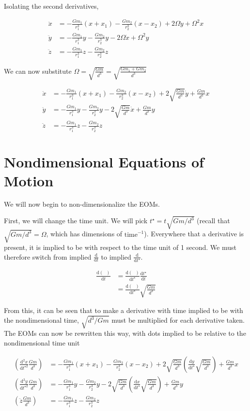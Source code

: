 \documentclass{article}
\newcommand{\dd}[2]{\frac{\mathrm{d}#1}{\mathrm{d}#2}}
\begin{document}
Isolating the second derivatives,

\[\begin{aligned}
    \ddot{x}&=-\frac{Gm_1}{r_1^3}(x+x_1)-\frac{Gm_2}{r_2^3}(x-x_2)+2\Omega\dot{y}+\Omega^2 x\\
    \ddot{y}&=-\frac{Gm_1}{r_1^3}y-\frac{Gm_2}{r_2^3}y-2\Omega\dot{x}+\Omega^2 y\\
    \ddot{z}&=-\frac{Gm_1}{r_1^3}z-\frac{Gm_2}{r_2^3}z
\end{aligned}\]
    
We can now substitute $\Omega=\sqrt{\frac{Gm}{d^3}}=\sqrt{\frac{Gm_1+Gm_2}{d^3}}$

\[\boxed{\begin{aligned}
    \ddot{x}&=-\frac{Gm_1}{r_1^3}(x+x_1)-\frac{Gm_2}{r_2^3}(x-x_2)+2\sqrt{\frac{Gm}{d^3}}\dot{y}+\frac{Gm}{d^3}x\\
    \ddot{y}&=-\frac{Gm_1}{r_1^3}y-\frac{Gm_2}{r_2^3}y-2\sqrt{\frac{Gm}{d^3}}\dot{x}+\frac{Gm}{d^3}y\\
    \ddot{z}&=-\frac{Gm_1}{r_1^3}z-\frac{Gm_2}{r_2^3}z
\end{aligned}}\]

\section*{Nondimensional Equations of Motion}
We will now begin to non-dimensionalize the EOMs.

First, we will change the time unit. We will pick $t^\star=t\sqrt{Gm/d^3}$ (recall that $\sqrt{Gm/d^3}=\Omega$, which has dimensions of $\text{time}^{-1}$). Everywhere that a derivative is present, it is implied to be with respect to the time unit of 1 second. We must therefore switch from implied $\dd{}{t}$ to implied $\dd{}{t^\star}$.

\[\begin{aligned}
    \dd{(\phantom{x})}{t}&=\dd{(\phantom{x})}{t^\star}\dd{t^\star}{t}\\
    &=\dd{(\phantom{x})}{t^\star}\sqrt{\frac{Gm}{d^3}}
\end{aligned}\]

From this, it can be seen that to make a derivative with time implied to be with the nondimensional time, $\sqrt{d^3/Gm}$ must be multiplied for each derivative taken. The EOMs can now be rewritten this way, with dots implied to be relative to the nondimensional time unit

\[\begin{aligned}
    \left(\dd{^2x}{t^{\star2}}\frac{Gm}{d^3}\right)&=-\frac{Gm_1}{r_1^3}(x+x_1)-\frac{Gm_2}{r_2^3}(x-x_2)+2\sqrt{\frac{Gm}{d^3}}\left(\dd{y}{t^\star}\sqrt{\frac{Gm}{d^3}}\right)+\frac{Gm}{d^3}x\\
    \left(\dd{^2y}{t^{\star2}}\frac{Gm}{d^3}\right)&=-\frac{Gm_1}{r_1^3}y-\frac{Gm_2}{r_2^3}y-2\sqrt{\frac{Gm}{d^3}}\left(\dd{x}{t^\star}\sqrt{\frac{Gm}{d^3}}\right)+\frac{Gm}{d^3}y\\
    \left(\ddot{z}\frac{Gm}{d^3}\right)&=-\frac{Gm_1}{r_1^3}z-\frac{Gm_2}{r_2^3}z
\end{aligned}\]
\end{document}
